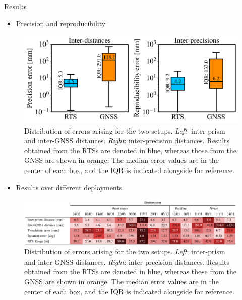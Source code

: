 \documentclass[final,hyperref={pdfpagelabels=false}]{beamer}
\begin{document}
\begin{frame}[t]
\begin{columns}[t]
\begin{column}{.465\textwidth}
\begin{block}{Results}
\begin{itemize}
    \item Precision and reproducibility
\end{itemize}
    \vspace{4mm}
    \begin{figure}
        \includegraphics[width=0.7\linewidth]
            {figures/boxplot_inter.pdf}%
        \captionsetup{width = 0.975\linewidth, justification=justified, name=Figure 3}
        \caption{
            Distribution of errors arising for the two setups. \emph{Left}: inter-prism and inter-\ac{GNSS} distances. \emph{Right}: inter-precision distances.
            Results obtained from the \acp{RTS} are denoted in blue, whereas those from the \ac{GNSS} are shown in orange.
            The median error values are in the center of each box, and the \ac{IQR} is indicated alongside for reference.}
        \label{fig:results_precision_reproducibility}
    \end{figure}

\begin{itemize}
    \item Results over different deployments
\end{itemize}
    \vspace{4mm}
    \begin{figure}
        \includegraphics[width=\linewidth]
            {figures/tableau_icra2024_results.png}%
        \captionsetup{width = 0.975\linewidth, justification=justified, name=Table 2}
        \caption{
            Distribution of errors arising for the two setups. \emph{Left}: inter-prism and inter-\ac{GNSS} distances. \emph{Right}: inter-precision distances.
            Results obtained from the \acp{RTS} are denoted in blue, whereas those from the \ac{GNSS} are shown in orange.
            The median error values are in the center of each box, and the \ac{IQR} is indicated alongside for reference.}
        \label{fig:results}
    \end{figure}


\end{block}
\end{column}
\end{columns}
\end{frame}
\end{document}
